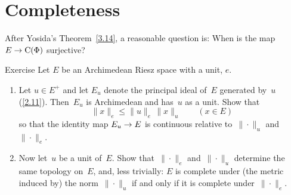 \documentclass[main.tex]{subfiles}
\begin{document}
\section{Completeness}
After Yosida's Theorem~\ref{3.14},
a reasonable question is:
When is the map~$E\rightarrow \mathrm{C}(\Phi)$ surjective?
%
%
\begin{psec}{4.1}{Exercise}
Let $E$ be an Archimedean Riesz space with a unit, $e$.
\begin{enumerate}
\item \label{4.1-1}
Let $u\in E^+$ 
and let $E_u$ denote the principal ideal of~$E$ 
generated by~$u$ (\ref{2.11}). 
Then~$E_u$ is Archimedean and has~$u$ as a unit.
Show that
\begin{equation*}
\| x \|_e \leq \| u \|_e \, \| x \|_u \qquad (x\in E)
\end{equation*}
so that the identity map $E_u \rightarrow E$
is continuous relative to~$\|\cdot\|_u$ and~$\|\cdot \|_e$.
%
\item \label{4.1-2}
Now let~$u$ be a unit of~$E$.
Show that~$\|\cdot\|_e$ and~$\|\cdot\|_u$
determine the same topology on~$E$,
and, less trivially:
$E$ is complete under (the metric induced by) 
the norm~$\|\cdot\|_u$
if and only if it is complete under~$\|\cdot\|_e$.
\end{enumerate}
\end{psec}
\clearpage
\end{document}
